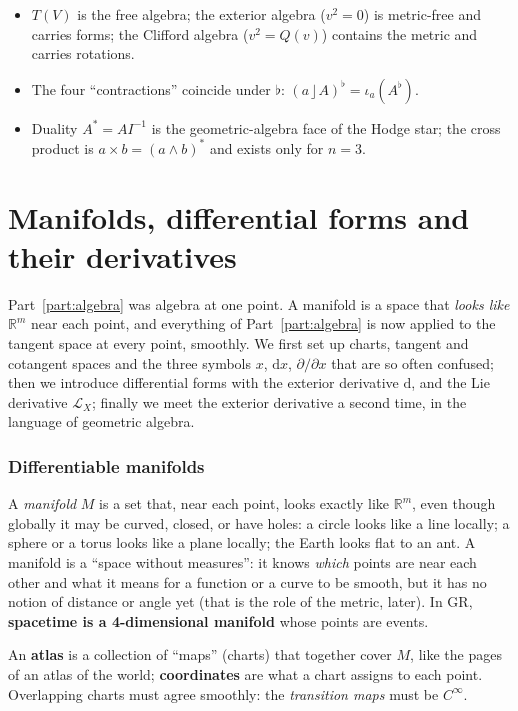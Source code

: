 \documentclass[11pt,a4paper]{article}
\numberwithin{equation}{section}
\theoremstyle{definition}
\theoremstyle{plain}
\newcommand{\R}{\mathbb{R}}
\newcommand{\dd}{\mathrm{d}}
\newcommand{\Lie}{\mathcal{L}}
\newcommand{\lc}{\mathbin{\rfloor}}
\newcommand{\pss}{I}
\newcommand{\dual}[1]{#1^{\ast}}
\begin{document}
\begin{keypoints}[Part I]
\begin{itemize}
\item $T(V)$ is the free algebra; the exterior algebra ($v^2=0$) is metric-free and carries forms; the Clifford algebra ($v^2=Q(v)$) contains the metric and carries rotations.
\item The four ``contractions'' coincide under $\flat$: $(a\lc A)^\flat=\iota_a(A^\flat)$.
\item Duality $\dual A=A\pss^{-1}$ is the geometric-algebra face of the Hodge star; the cross product is $a\times b=\dual{(a\wedge b)}$ and exists only for $n=3$.
\end{itemize}
\end{keypoints}


\clearpage
\part{Manifolds, differential forms and their derivatives}\label{part:manifolds}

Part~\ref{part:algebra} was algebra at one point. A manifold is a space that \emph{looks like} $\R^m$ near each point, and
everything of Part~\ref{part:algebra} is now applied to the tangent space at every point, smoothly. We first set up charts,
tangent and cotangent spaces and the three symbols $x$, $\dd x$, $\partial/\partial x$ that are so often confused; then we
introduce differential forms with the exterior derivative $\dd$, and the Lie derivative $\Lie_X$; finally we meet the exterior
derivative a second time, in the language of geometric algebra.

\section{Differentiable manifolds}\label{sec:manifolds}
\begin{intuition}
A \emph{manifold} $M$ is a set that, near each point, looks exactly like $\R^m$, even though globally it may be curved, closed, or have holes: a circle looks like a line locally; a sphere or a torus looks like a plane locally; the Earth looks flat to an ant. A manifold is a ``space without measures'': it knows \emph{which} points are near each other and what it means for a function or a curve to be smooth, but it has no notion of distance or angle yet (that is the role of the metric, later). In GR, \textbf{spacetime is a 4-dimensional manifold} whose points are events.

An \textbf{atlas} is a collection of ``maps'' (charts) that together cover $M$, like the pages of an atlas of the world; \textbf{coordinates} are what a chart assigns to each point. Overlapping charts must agree smoothly: the \emph{transition maps} must be $C^\infty$.
\end{intuition}
\end{document}
